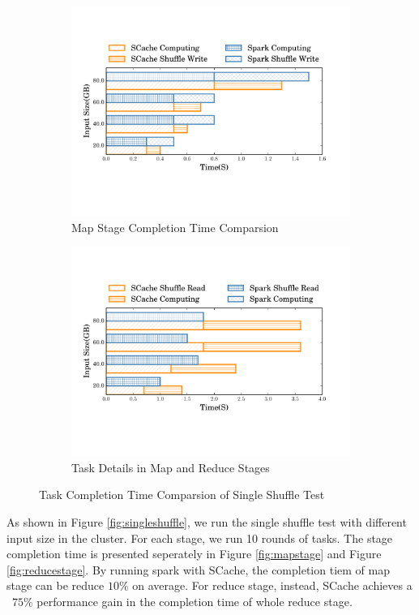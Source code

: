 \begin{figure}
	\begin{subfigure}{\linewidth}
		\centering
		\includegraphics[width=0.9\linewidth]{fig/groupbymaptask}
		\caption{Map Stage Completion Time Comparsion}
		\label{fig:maptask}
	\end{subfigure}
	\begin{subfigure}{\linewidth}
		\centering
		\includegraphics[width=0.9\linewidth]{fig/groupbyreducetask}
		\caption{Task Details in Map and Reduce Stages}
		\label{fig:reducetask}
	\end{subfigure}
	\caption{Task Completion Time Comparsion of Single Shuffle Test}
	\label{fig:singleshuffletask}
\end{figure}
As shown in Figure \ref{fig:singleshuffle}, we run the single shuffle test with different input size in the cluster. For each stage, we run 10 rounds of tasks. The stage completion time is presented seperately in Figure \ref{fig:mapstage} and Figure \ref{fig:reducestage}. By running spark with SCache, the completion tiem of map stage can be reduce $10\%$ on average. For reduce stage, instead, SCache achieves a ~$75\%$ performance gain in the completion time of whole reduce stage.


